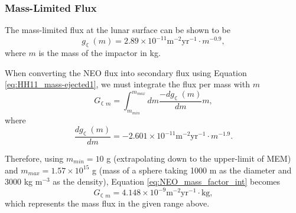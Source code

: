 \documentclass{hitec}
\numberwithin{equation}{section}
\begin{document}
\subsubsection{Mass-Limited Flux}

The mass-limited flux at the lunar surface can be shown to be
\begin{equation}\label{eq:NEO_mass_factor_int}
g_\leftmoon (m) = 2.89\times 10^{-11} \text{m}^{-2}\text{yr}^{-1}\cdot m^{-0.9},
\end{equation}
where $m$ is the mass of the impactor in kg.

When converting the NEO flux into secondary flux using Equation \eqref{eq:HH11_mass-ejected1}, we must integrate the flux per mass with $m$
\begin{equation}
G_{\leftmoon m} = \int_{m_{min}}^{m_{max}}dm\frac{-d g_\leftmoon(m)}{dm}m,
\end{equation}
where 
\begin{equation}
\frac{d g_\leftmoon(m)}{dm} = -2.601 \times 10^{-11} \text{m}^{-2}\text{yr}^{-1}\cdot m^{-1.9}.
\end{equation}

Therefore, using $m_{min} = 10 $ g (extrapolating down to the upper-limit of MEM) and $m_{max} = 1.57 \times 10^{15}$ g (mass of a sphere taking 1000 m as the diameter and 3000 kg m$^{-3}$ as the density), Equation \eqref{eq:NEO_mass_factor_int} becomes
\begin{equation}
G_{\leftmoon m} = 4.148 \times 10^{-9} \text{m}^{-2}\text{yr}^{-1} \cdot \text{kg},
\end{equation}
which represents the mass flux in the given range above.

\end{document}
